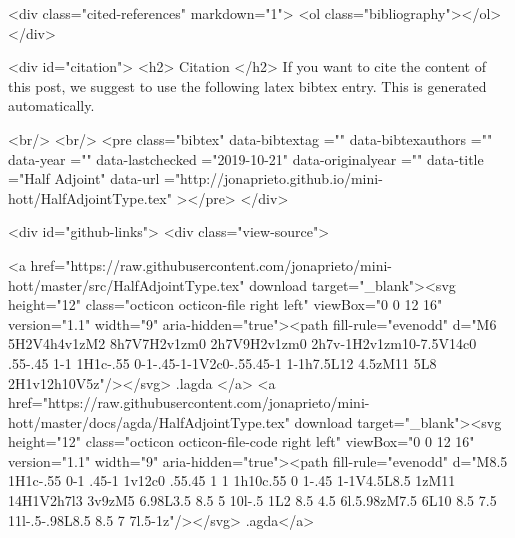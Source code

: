   <div class="cited-references" markdown="1">
  <ol class="bibliography"></ol>
  </div>


  
  <div id="citation">
  <h2> Citation </h2>
  If you want to cite the content of this post,
  we suggest to use the following latex bibtex entry.
  This is generated automatically.

  <br/>
  <br/>
  <pre class="bibtex"
       data-bibtextag =""
       data-bibtexauthors =""
       data-year =""
       data-lastchecked ="2019-10-21"
       data-originalyear =""
       data-title ="Half Adjoint"
       data-url ="http://jonaprieto.github.io/mini-hott/HalfAdjointType.tex"
  ></pre>
  </div>
  

  <div id="github-links">
    <div class="view-source">
      
        <a href="https://raw.githubusercontent.com/jonaprieto/mini-hott/master/src/HalfAdjointType.tex" download target="_blank"><svg height="12" class="octicon octicon-file right left" viewBox="0 0 12 16" version="1.1" width="9" aria-hidden="true"><path fill-rule="evenodd" d="M6 5H2V4h4v1zM2 8h7V7H2v1zm0 2h7V9H2v1zm0 2h7v-1H2v1zm10-7.5V14c0 .55-.45 1-1 1H1c-.55 0-1-.45-1-1V2c0-.55.45-1 1-1h7.5L12 4.5zM11 5L8 2H1v12h10V5z"/></svg> .lagda </a>
        <a href="https://raw.githubusercontent.com/jonaprieto/mini-hott/master/docs/agda/HalfAdjointType.tex" download target="_blank"><svg height="12" class="octicon octicon-file-code right left" viewBox="0 0 12 16" version="1.1" width="9" aria-hidden="true"><path fill-rule="evenodd" d="M8.5 1H1c-.55 0-1 .45-1 1v12c0 .55.45 1 1 1h10c.55 0 1-.45 1-1V4.5L8.5 1zM11 14H1V2h7l3 3v9zM5 6.98L3.5 8.5 5 10l-.5 1L2 8.5 4.5 6l.5.98zM7.5 6L10 8.5 7.5 11l-.5-.98L8.5 8.5 7 7l.5-1z"/></svg> .agda</a>
      
